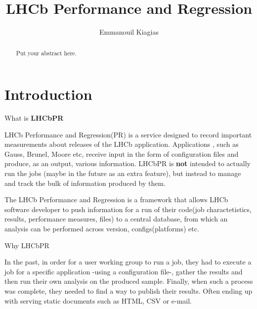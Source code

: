 \documentclass{lhcbnote}
\title{LHCb Performance and Regression}
\author{Emmanouil Kiagias}%
\begin{document}
\maketitle

\begin{abstract}
Put your abstract here.
\end{abstract}

\begin{status}
\end{status}

\tableofcontents

\listoffigures 
\listoftables

\section{Introduction}

What is { \bf LHCbPR }

\vspace{4 mm}

LHCb Performance and Regression(PR) is a service designed to record important measurements about releases of the 
LHCb application. Applications , such as Gauss, Brunel, Moore etc,  receive input in the form of configuration files 
and produce, as an output, various information.
LHCbPR is {\bf not} intended to actually run the jobs (maybe in the future as an extra feature), but instead to manage and track the bulk of information produced by them.
	
The LHCb Performance and Regression is a framework that allows LHCb software developer to push information for
a run of their code(job charactetistics, results, performance measures, files) to a central database, from which an analysis can be performed across
version, configs(platforms) etc.

\vspace{6 mm}

\noindent Why LHCbPR


\vspace{4 mm}

 In the past, in order for a user working group to run a  job, they had to execute a job for a specific application -using a configuration file-, 
gather the results and then run their own analysis on the produced sample. 
Finally, when such a process was complete, they needed to find a way to publish their results.
Often ending up with serving static documents such as HTML, CSV or e-mail.
	
\end{document}

